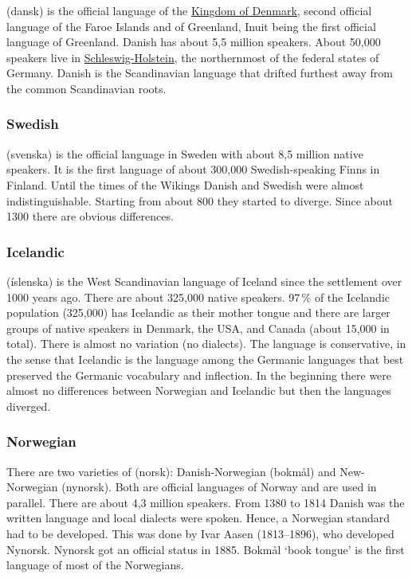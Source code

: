 (dansk) is the official language of the \href{https://en.wikipedia.org/wiki/Denmark}{Kingdom of Denmark}, second official language of the
Faroe Islands and of Greenland, Inuit being the first official language of
Greenland. Danish has about 5,5 million speakers. About 50,000 speakers live in \href{https://en.wikipedia.org/wiki/Schleswig-Holstein}{Schleswig-Holstein}, the northernmost of the federal states of Germany.
Danish is the Scandinavian language that drifted furthest away from the common Scandinavian roots.


\subsubsection{Swedish}

 (svenska) is the official language in Sweden with about 8,5 million native speakers. It is
the first language of about 300,000 Swedish-speaking Finns in Finland. Until the times of the
Wikings Danish and Swedish were almost indistinguishable. Starting from about 800 they started to
diverge. Since about 1300 there are obvious differences.



\subsubsection{Icelandic}


 (íslenska) is the West Scandinavian language of Iceland since the settlement over 1000
years ago. 
There are about 325,000 native speakers. 97\,\% of the Icelandic population (325,000) has Icelandic as their
mother tongue and there are larger groups of native speakers in Denmark, the USA, and Canada
(about 15,000 in total). 
There is almost no variation (no dialects). The language is conservative, in the sense that Icelandic
is the language among the Germanic languages that best preserved the Germanic vocabulary and inflection.
In the beginning there were almost no differences between Norwegian and Icelandic but then the
languages diverged.

\subsubsection{Norwegian}

There are two varieties of  (norsk): Danish-Norwegian (bokmål) and New-Norwegian (nynorsk). 
Both are official languages of Norway and are used in parallel. There are about 4,3 million
speakers.
From 1380 to 1814 Danish was the written language and local dialects were spoken. Hence, a Norwegian
standard had to be developed. This was done by Ivar Aasen (1813--1896), who developed
Nynorsk. Nynorsk got an official status in 1885. Bokmål `book tongue' is the first language of most
of the Norwegians.

